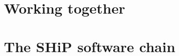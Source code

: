 \documentclass[11pt,a4paper,twoside,openany,parskip=half,
  headings=small,chapterprefix=true]{scrbook}
\begin{document}
\frontmatter

\tableofcontents


\mainmatter
\part{Working together}






\part{The SHiP software chain}












\appendix




\end{document}
